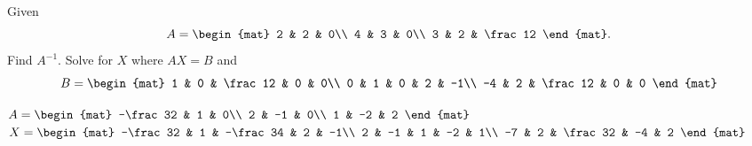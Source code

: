 

\begin{Exercise}[
name={},
title={}, 
difficulty=0,
origin={\cite{YL}}]
Given
\[
A=
\begin{mat}
2 & 2 & 0\\
4 & 3 & 0\\
3 & 2 & \frac12
\end{mat}.
\]
\Question Find $A^{-1}$.
\Question Solve for $X$ where $AX=B$ and 
\[
B=
\begin{mat}
1  & 0 & \frac12 & 0 & 0\\
0  & 1 & 0 & 2 & -1\\
-4 & 2 & \frac12 & 0 & 0
\end{mat}
\]
\end{Exercise}

\begin{Answer}
\Question
$
A=
\begin{mat}
-\frac32 & 1 & 0\\
2 & -1 & 0\\
1 & -2 & 2
\end{mat}
$
\Question
$
X=
\begin{mat}
-\frac32 & 1 & -\frac34 & 2 & -1\\
2 & -1 & 1 & -2 & 1\\
-7 & 2 & \frac32 & -4 & 2
\end{mat}
$
\end{Answer}
